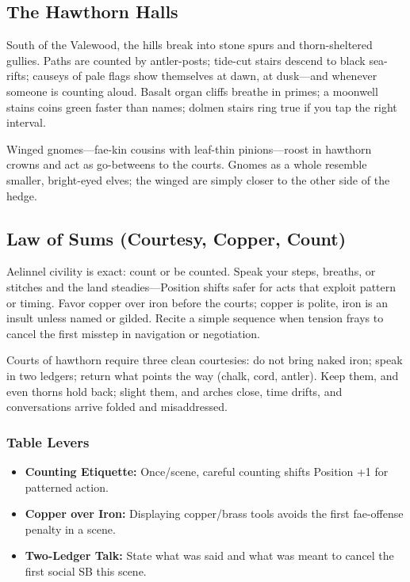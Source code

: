 \documentclass[11pt]{book}
\begin{document}
\subsection*{The Hawthorn Halls}
South of the Valewood, the hills break into stone spurs and thorn-sheltered gullies. Paths are counted by antler-posts; tide-cut stairs descend to black sea-rifts; causeys of pale flags show themselves at dawn, at dusk---and whenever someone is counting aloud. Basalt organ cliffs breathe in primes; a moonwell stains coins green faster than names; dolmen stairs ring true if you tap the right interval.

Winged gnomes---fae-kin cousins with leaf-thin pinions---roost in hawthorn crowns and act as go-betweens to the courts. Gnomes as a whole resemble smaller, bright-eyed elves; the winged are simply closer to the other side of the hedge.

\subsection*{Law of Sums (Courtesy, Copper, Count)}
Aelinnel civility is exact: count or be counted. Speak your steps, breaths, or stitches and the land steadies---Position shifts safer for acts that exploit pattern or timing. Favor copper over iron before the courts; copper is polite, iron is an insult unless named or gilded. Recite a simple sequence when tension frays to cancel the first misstep in navigation or negotiation.

Courts of hawthorn require three clean courtesies: do not bring naked iron; speak in two ledgers; return what points the way (chalk, cord, antler). Keep them, and even thorns hold back; slight them, and arches close, time drifts, and conversations arrive folded and misaddressed.

\subsubsection*{Table Levers}
\begin{itemize}
    \item \textbf{Counting Etiquette:} Once/scene, careful counting shifts Position +1 for patterned action.
    \item \textbf{Copper over Iron:} Displaying copper/brass tools avoids the first fae-offense penalty in a scene.
    \item \textbf{Two-Ledger Talk:} State what was said and what was meant to cancel the first social SB this scene.
\end{itemize}
\end{document}
